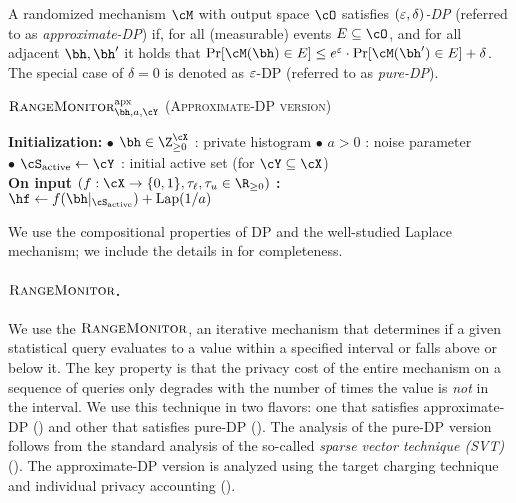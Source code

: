 \begin{definition}
    A randomized mechanism $\cM$ with output space $\cO$ satisfies \emph{$(\varepsilon, \delta)$-DP} (referred to as \emph{approximate-DP}) if, for all (measurable) events $E\subseteq \cO$, and for all adjacent $\bh, \bh'$ it holds that
    $
    \Pr[\cM(\bh) \in E] \le e^\eps \cdot \Pr[\cM(\bh') \in E] + \delta
    $.
    The special case of $\delta = 0$ is denoted as $\varepsilon$-DP (referred to as \emph{pure-DP}).
\end{definition}



\begin{algorithm}[t]
\small
\caption{\textsc{$\OutsideIntervalMonitor^{\mathrm{apx}}_{\bh, a, \cY}$ (Approximate-DP version)}}
\label{alg:outside-thresholds}

\textbf{Initialization:}
{\footnotesize $\bullet$ } $\bh \in \Z_{\ge 0}^{\cX}$ : private histogram \qquad \qquad 
{\footnotesize $\bullet$ } $a > 0$ : noise parameter\\
{\footnotesize $\bullet$ } $\cS_{\acti} \gets \cY$ : initial active set (for $\cY \subseteq \cX$)\\[-2mm]

\textbf{On input} $(f: \cX \to \{0, 1\}, \tau_\ell, \tau_u \in \R_{\ge 0})$ {\bf :}\\[-2mm]

$\hf \gets f(\bh|_{\cS_{\acti}}) + \Lap(1/a)$\;

 {
    \Return{\Between}\;
}
\end{algorithm}

We use the compositional properties of DP and the well-studied Laplace mechanism; we include the details in  for completeness.
%

\paragraph{$\textsc{RangeMonitor}$.}
We use the $\textsc{RangeMonitor}$, an iterative mechanism that determines if a given statistical query evaluates to a value within a specified interval or falls above or below it. The key property is that the privacy cost of the entire mechanism on a sequence of queries only degrades with the number of times the value is {\em not} in the interval. We use this technique in two flavors: one that satisfies approximate-DP () and other that satisfies pure-DP (). The analysis of the pure-DP version follows from the standard analysis of the so-called {\em sparse vector technique (SVT)} (). The approximate-DP version is analyzed using the target charging technique~\citep{Cohen:2023} and individual privacy accounting ().


